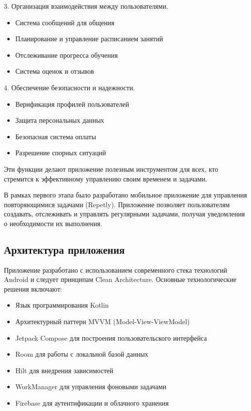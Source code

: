 \documentclass[14pt, russian]{scrartcl}
\begin{document}
3. Организация взаимодействия между пользователями.
   \begin{itemize}
   \item Система сообщений для общения
   \item Планирование и управление расписанием занятий
   \item Отслеживание прогресса обучения
   \item Система оценок и отзывов
   \end{itemize}

4. Обеспечение безопасности и надежности.
   \begin{itemize}
   \item Верификация профилей пользователей
   \item Защита персональных данных
   \item Безопасная система оплаты
   \item Разрешение спорных ситуаций
   \end{itemize}

Эти функции делают приложение полезным инструментом для всех, кто стремится к эффективному управлению своим временем и задачами.

В рамках первого этапа было разработано мобильное приложение для управления повторяющимися задачами (Repetly). Приложение позволяет пользователям создавать, отслеживать и управлять регулярными задачами, получая уведомления о необходимости их выполнения.

\subsection{Архитектура приложения}\label{sect:architecture}

Приложение разработано с использованием современного стека технологий Android и следует принципам Clean Architecture. Основные технологические решения включают:

\begin{itemize}
\item Язык программирования Kotlin
\item Архитектурный паттерн MVVM (Model-View-ViewModel)
\item Jetpack Compose для построения пользовательского интерфейса
\item Room для работы с локальной базой данных
\item Hilt для внедрения зависимостей
\item WorkManager для управления фоновыми задачами
\item Firebase для аутентификации и облачного хранения
\end{itemize}
\end{document}
